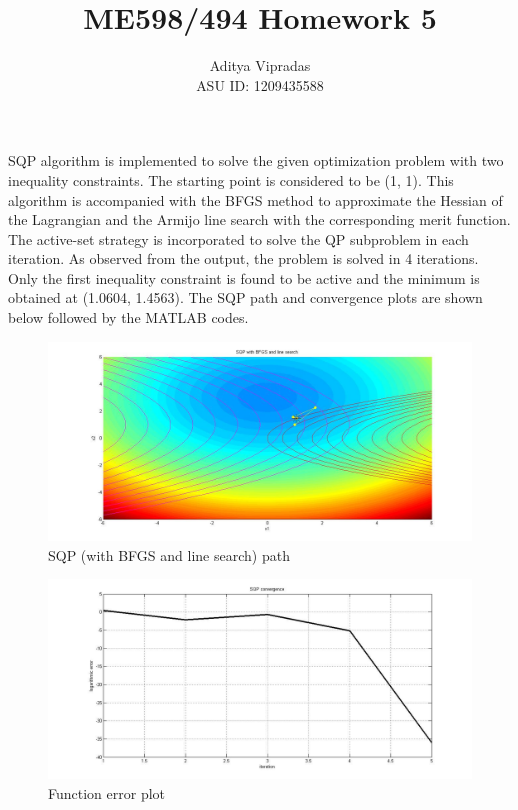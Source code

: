 \documentclass[12pt]{article}
\title{\textbf{ME598/494 Homework 5}}
\author{Aditya Vipradas\\ASU ID: 1209435588}
\begin{document}
\maketitle
SQP algorithm is implemented to solve the given optimization problem with two inequality constraints. The starting point is considered to be (1, 1). This algorithm is accompanied with the BFGS method to approximate the Hessian of the Lagrangian and the Armijo line search with the corresponding merit function. The active-set strategy is incorporated to solve the QP subproblem in each iteration. As observed from the output, the problem is solved in 4 iterations. Only the first inequality constraint is found to be active and the minimum is obtained at (1.0604, 1.4563). The SQP path and convergence plots are shown below followed by the MATLAB codes.
\begin{figure}[H]
\begin{center}
\includegraphics[scale=0.35]{1.jpg}
\caption{SQP (with BFGS and line search) path}  
\end{center}
\end{figure}
\begin{figure}[H]
\begin{center}
\includegraphics[scale=0.35]{2.jpg}
\caption{Function error plot}  
\end{center}
\end{figure}
\end{document}
